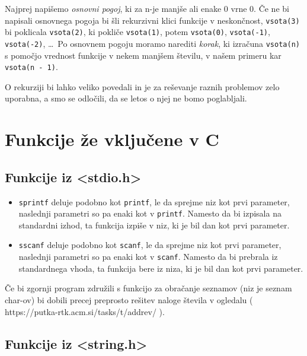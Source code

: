 Najprej napišemo \emph{osnovni pogoj}, ki za n-je manjše ali enake 0 vrne 0. Če
ne bi napisali osnovnega pogoja bi šli rekurzivni klici funkcije v neskončnost,
\verb+vsota(3)+ bi poklicala \verb+vsota(2)+, ki pokliče \verb+vsota(1)+, potem
\verb+vsota(0)+, \verb+vsota(-1)+, \verb+vsota(-2)+, \ldots \ Po osnovnem
pogoju moramo narediti \emph{korak}, ki izračuna \verb+vsota(n)+ s pomočjo
vrednost funkcije v nekem manjšem številu, v našem primeru kar
\verb+vsota(n - 1)+.

O rekurziji bi lahko veliko povedali in je za reševanje raznih problemov zelo
uporabna, a smo se odločili, da se letos o njej ne bomo poglabljali.


\section{Funkcije že vključene v C}

\subsection{Funkcije iz <stdio.h>}

\begin{itemize}
    \item \verb+sprintf+ deluje podobno kot \verb+printf+, le da sprejme niz
        kot prvi parameter, naslednji parametri so pa enaki kot v
        \verb+printf+. Namesto da bi izpisala na standardni izhod, ta funkcija
        izpiše v niz, ki je bil dan kot prvi parameter.
    \item \verb+sscanf+ deluje podobno kot \verb+scanf+, le da sprejme niz kot
        prvi parameter, naslednji parametri so pa enaki kot v \verb+scanf+.
        Namesto da bi prebrala iz standardnega vhoda, ta funkcija bere iz niza,
        ki je bil dan kot prvi parameter.
\end{itemize}

\begin{examples}
\end{examples}

Če bi zgornji program združili s funkcijo za obračanje seznamov (niz je seznam
char-ov) bi dobili precej preprosto rešitev naloge števila v ogledalu
( https://putka-rtk.acm.si/tasks/t/addrev/ ).

\subsection{Funkcije iz <string.h>}

